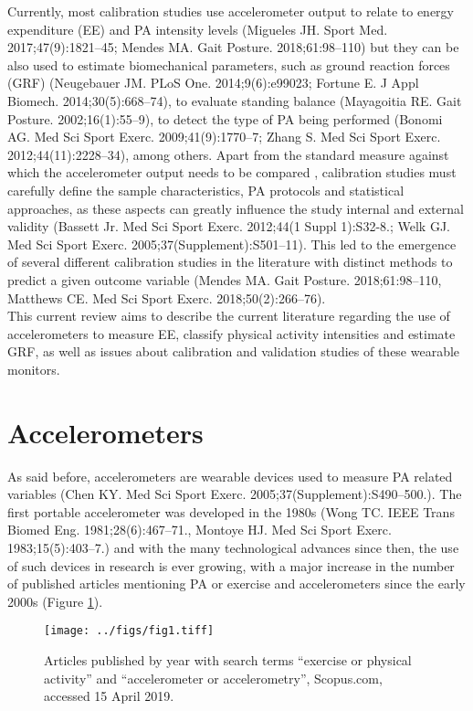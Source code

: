 \documentclass[11pt]{article}
\begin{document}
Currently, most calibration studies use accelerometer output to relate to energy expenditure (EE) and PA intensity levels {\tiny (Migueles JH. Sport Med. 2017;47(9):1821–45; Mendes MA. Gait Posture. 2018;61:98–110)} but they can be also used to estimate biomechanical parameters, such as ground reaction forces (GRF) {\tiny (Neugebauer JM. PLoS One. 2014;9(6):e99023; Fortune E. J Appl Biomech. 2014;30(5):668–74)}, to evaluate standing balance	{\tiny (Mayagoitia RE. Gait Posture. 2002;16(1):55–9)}, to detect the type of PA being performed {\tiny (Bonomi AG. Med Sci Sport Exerc. 2009;41(9):1770–7; Zhang S. Med Sci Sport Exerc. 2012;44(11):2228–34)}, among others. Apart from the standard measure against which the accelerometer output needs to be compared	, calibration studies must carefully define the sample characteristics, PA protocols and statistical approaches, as these aspects can greatly influence the study internal and external validity {\tiny (Bassett  Jr. Med Sci Sport Exerc. 2012;44(1 Suppl 1):S32-8.; Welk GJ. Med Sci Sport Exerc. 2005;37(Supplement):S501–11)}. This led to the emergence of several different calibration studies in the literature with distinct methods to predict a given outcome variable {\tiny (Mendes MA. Gait Posture. 2018;61:98–110, Matthews CE. Med Sci Sport Exerc. 2018;50(2):266–76)}. \\

This current review aims to describe the current literature regarding the use of accelerometers to measure EE, classify physical activity intensities and estimate GRF, as well as issues about calibration and validation studies of these wearable monitors. 

\section*{Accelerometers}

As said before, accelerometers are wearable devices used to measure PA related variables {\tiny (Chen KY. Med Sci Sport Exerc. 2005;37(Supplement):S490–500.)}. The first portable accelerometer was developed in the 1980s {\tiny (Wong TC. IEEE Trans Biomed Eng. 1981;28(6):467–71., Montoye HJ. Med Sci Sport Exerc. 1983;15(5):403–7.)} and with the many technological advances since then, the use of such devices in research is ever growing, with a major increase in the number of published articles mentioning PA or exercise and accelerometers since the early 2000s (Figure \ref{art_year}).

\begin{figure}[h!]
	\texttt{[image: ../figs/fig1.tiff]}
	\caption{Articles published by year with search terms ``exercise or physical activity'' and ``accelerometer or accelerometry'', Scopus.com, accessed 15 April 2019.}
	\label{art_year}
\end{figure}
\end{document}
